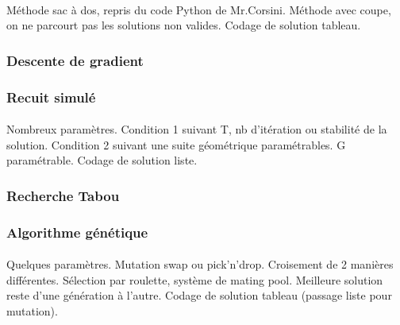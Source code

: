 \documentclass[12pt]{article}
\begin{document}
\paragraph{}Méthode sac à dos, repris du code Python de Mr.Corsini. Méthode avec coupe, on ne parcourt pas les solutions non valides. Codage de solution tableau.

\subsubsection{Descente de gradient}

\subsubsection{Recuit simulé}

\paragraph{}Nombreux paramètres. Condition 1 suivant T, nb d'itération ou stabilité de la solution. Condition 2 suivant une suite géométrique paramétrables. G paramétrable. Codage de solution liste.

\subsubsection{Recherche Tabou}

\subsubsection{Algorithme génétique}

\paragraph{}Quelques paramètres. Mutation swap ou pick'n'drop. Croisement de 2 manières différentes. Sélection par roulette, système de mating pool. Meilleure solution reste d'une génération à l'autre. Codage de solution tableau (passage liste pour mutation).
\end{document}
